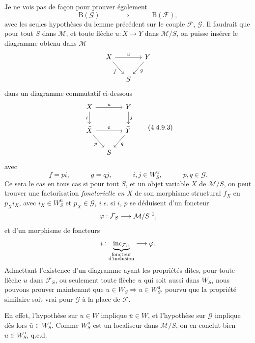 Je ne vois pas de façon pour prouver également
\[
\mathrm{B}(\mathcal{G}) \qquad\quad \Longrightarrow \qquad\quad \mathrm{B}(\mathcal{F}),
\]
avec les seules hypothèses du lemme précédent sur le couple $\mathcal{F}$, $\mathcal{G}$. Il faudrait que pour tout $S$ dans $\mathcal{M}$, et toute flèche
$u : X \longrightarrow Y$ dans $\mathcal{M}/S$, on puisse insérer le diagramme obtenu dans $\mathcal{M}$
\[
\begin{tikzcd}[column sep=small]
X \arrow[rr, "u"] \arrow[dr, "f"'] & & Y \arrow[dl, "g"] \\
& S &
\end{tikzcd}
\]
dans un diagramme commutatif ci-dessous
\[
\begin{tikzcd}[column sep=small]
X \arrow[rr, "u"] \arrow[d, "i"'] & & Y \arrow[d, "j"] \\
\bar{X} \arrow[rr, "\bar{u}"] \arrow[dr, "p"'] & & \bar{Y} \arrow[dl, "q"] \\
& S &
\end{tikzcd}
\tag*{(4.4.9.3)}
\]
avec
\[
f = pi, \qquad\quad g = qj, \qquad\quad i, j \in W^{\mathrm{u}}_S, \qquad\quad p, q \in \mathcal{G}.
\]
Ce sera le cas en tous cas si pour tout $S$, et un objet variable $X$ de $\mathcal{M}/S$, on peut trouver une factorisation \textit{fonctorielle en} $X$ de son morphisme structural $f_X$ en $p_X i_X$, avec $i_X \in W^{\mathrm{u}}_S$ et $p_X \in \mathcal{G}$, \textit{i.e.} si $i$, $p$ se déduisent d'un foncteur
\[
\varphi : \mathcal{F}_S \longrightarrow \mathcal{M}/S \ \text{\footnotemark},
\]
et d'un morphisme de foncteurs
\[
i : \underbrace{\mathrm{inc}_{\mathcal{F}_S}}_{\substack{\text{foncteur}\\ \text{d'inclusion}}} \longrightarrow \varphi.
\]
Admettant l'existence d'un diagramme ayant les propriétés dites, pour toute flèche $u$ dans $\mathcal{F}_S$, ou seulement toute flèche $u$ qui soit aussi dans $W_S$, nous pouvons prouver maintenant que $u \in W_S \Longrightarrow u \in W^{\mathrm{u}}_S$, pourvu que la propriété similaire soit vrai pour $\mathcal{G}$ à la place de $\mathcal{F}$.

En effet, l'hypothèse sur $u \in W$ implique $\bar{u} \in W$, et l'hypothèse sur $\mathcal{G}$ implique dès lors $\bar{u} \in W^{\mathrm{u}}_S$. Comme $W^{\mathrm{u}}_S$ est un localiseur dans $\mathcal{M}/S$, on en conclut bien $u \in W^{\mathrm{u}}_S$, q.e.d.

